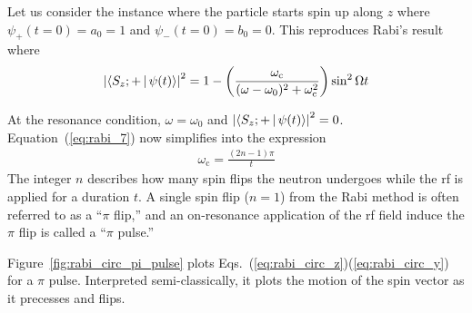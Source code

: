 %
Let us consider the instance where the particle starts spin up along $z$ where $\psi_+(t=0)=a_0=1$ and $\psi_-(t=0)=b_0=0$. This reproduces Rabi's result \cite{rabi_1938} where
%
\begin{gather}
    \left| \Braket{S_z;+ | \psi(t)} \right|^2 = 1-\left( \frac{\omega_\text{c}}{(\omega -\omega_0)^2+\omega_\text{c}^2} \right) \sin^2\Omega t \label{eq:rabi_7}
\end{gather}
%

At the resonance condition, $\omega=\omega_0$ and $\left| \Braket{S_z;+ | \psi(t)} \right|^2=0$. Equation~(\ref{eq:rabi_7}) now simplifies into the expression
%
\begin{gather}
    \omega_\text{c}=\frac{(2n-1)\pi}{t} \label{eq:rabi_pi_pulse_time}
\end{gather}
%
The integer $n$ describes how many spin flips the neutron undergoes while the \acrshort*{rf} is applied for a duration $t$. A single spin flip ($n=1$) from the Rabi method is often referred to as a ``$\pi$ flip,'' and an on-resonance application of the \acrshort*{rf} field induce the $\pi$ flip is called a ``$\pi$ pulse.''

Figure~\ref{fig:rabi_circ_pi_pulse} plots Eqs.~(\ref{eq:rabi_circ_z})\textendash (\ref{eq:rabi_circ_y}) for a $\pi$ pulse. Interpreted semi-classically, it plots the motion of the spin vector as it precesses and flips.

